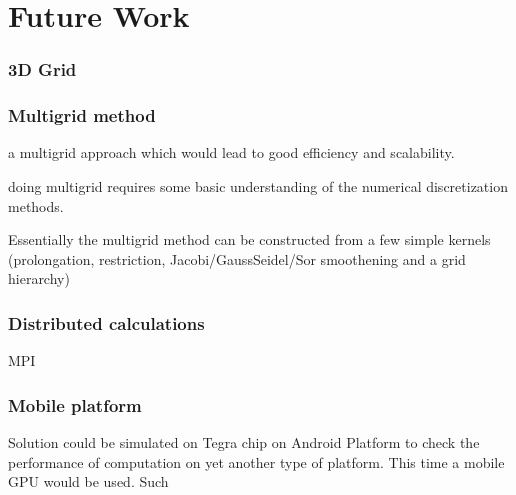 \section{Future Work}

\subsubsection{3D Grid}

\subsubsection{Multigrid method}
a multigrid approach which would lead to good efficiency and
scalability. 

 doing multigrid requires some basic understanding of
the numerical discretization methods. 

 Essentially the multigrid method can be constructed from
a few simple kernels (prolongation, restriction, Jacobi/GaussSeidel/Sor
smoothening and a grid hierarchy)


\subsubsection{Distributed calculations}
MPI


\subsubsection{Mobile platform}


Solution could be simulated on Tegra chip on Android Platform to check the performance of computation on yet another type of platform. This time a mobile GPU would be used. Such
